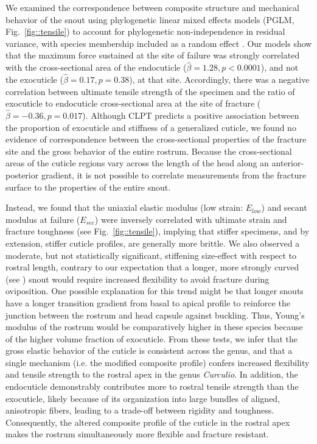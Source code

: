 \documentclass[twocolumn, linenumbers, superscriptaddress, nofootinbib]{revtex4-1}
\begin{document}
		We examined the correspondence between composite structure and mechanical behavior of the snout using phylogenetic linear mixed effects models (PGLM, Fig.~\ref{fig::tensile}) to account for phylogenetic non-independence in residual variance, with species membership included as a random effect \cite{Revell2010, Felsenstein1985}.
		Our models show that the maximum force sustained at the site of failure was strongly correlated with the cross-sectional area of the endocuticle ($\hat{\beta}=1.28, p<0.0001$), and not the exocuticle ($\hat{\beta}=0.17, p=0.38$), at that site.
		Accordingly, there was a negative correlation between ultimate tensile strength of the specimen and the ratio of exocuticle to endocuticle cross-sectional area at the site of fracture ($\hat{\beta}=-0.36, p=0.017$).
		Although CLPT predicts a positive association between the proportion of exocuticle and stiffness of a generalized cuticle, we found no evidence of correspondence between the cross-sectional properties of the fracture site and the gross behavior of the entire rostrum.
		Because the cross-sectional areas of the cuticle regions vary across the length of the head along an anterior-posterior gradient, it is not possible to correlate measurements from the fracture surface to the properties of the entire snout.
		
		Instead, we found that the uniaxial elastic modulus (low strain: $E_{low}$) and secant modulus at failure ($E_{sec}$) were inversely correlated with ultimate strain and fracture toughness (see Fig.~\ref{fig::tensile}), implying that stiffer specimens, and by extension, stiffer cuticle profiles, are generally more brittle.
		We also observed a moderate, but not statistically significant, stiffening size-effect with respect to rostral length, contrary to our expectation that a longer, more strongly curved (see \cite{Hughes2004eco, Bonal2011}) snout would require increased flexibility to avoid fracture during oviposition.
		One possible explanation for this trend might be that longer snouts have a longer transition gradient from basal to apical profile to reinforce the junction between the rostrum and head capsule against buckling.
		Thus, Young's modulus of the rostrum would be comparatively higher in these species because of the higher volume fraction of exocuticle.
		From these tests, we infer that the gross elastic behavior of the cuticle is consistent across the genus, and that a single mechanism (i.e. the modified composite profile) confers increased flexibility and tensile strength to the rostral apex in the genus \textit{Curculio}.
		In addition, the endocuticle demonstrably contributes more to rostral tensile strength than the exocuticle, likely because of its organization into large bundles of aligned, anisotropic fibers, leading to a trade-off between rigidity and toughness.
		Consequently, the altered composite profile of the cuticle in the rostral apex makes the rostrum simultaneously more flexible and fracture resistant.
		
\end{document}
